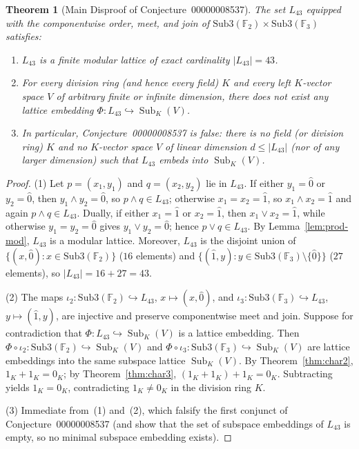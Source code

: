\documentclass[11pt]{article}
\newtheorem{theorem}{Theorem}[section]
\theoremstyle{definition}
\newcommand{\Sub}{\operatorname{Sub}}
\newcommand{\FF}{\mathbb{F}}
\begin{document}
\begin{theorem}[Main Disproof of Conjecture~00000008537]\label{thm:main}
The set $L_{43}$ equipped with the componentwise order, meet, and join of
$\mathrm{Sub3}(\FF_2) \times \mathrm{Sub3}(\FF_3)$ satisfies:
\begin{enumerate}
  \item[\textup{(1)}] $L_{43}$ is a finite modular lattice of exact cardinality
  $|L_{43}| = 43$.
  \item[\textup{(2)}] For every division ring (and hence every field) $K$ and every left
  $K$-vector space $V$ of arbitrary finite or infinite dimension, there does \emph{not}
  exist any lattice embedding $\Phi : L_{43} \hookrightarrow \Sub_K(V)$.
  \item[\textup{(3)}] In particular, Conjecture~00000008537 is false: there is no field
  (or division ring) $K$ and no $K$-vector space $V$ of linear dimension $d \le |L_{43}|$
  (nor of any larger dimension) such that $L_{43}$ embeds into $\Sub_K(V)$.
\end{enumerate}
\end{theorem}
\begin{proof}
(1) Let $p = (x_1, y_1)$ and $q = (x_2, y_2)$ lie in $L_{43}$. If either $y_1 = \hat{0}$
or $y_2 = \hat{0}$, then $y_1 \wedge y_2 = \hat{0}$, so $p \wedge q \in L_{43}$; otherwise
$x_1 = x_2 = \hat{1}$, so $x_1 \wedge x_2 = \hat{1}$ and again $p \wedge q \in L_{43}$.
Dually, if either $x_1 = \hat{1}$ or $x_2 = \hat{1}$, then $x_1 \vee x_2 = \hat{1}$, while
otherwise $y_1 = y_2 = \hat{0}$ gives $y_1 \vee y_2 = \hat{0}$; hence $p \vee q \in L_{43}$.
By Lemma~\ref{lem:prod-mod}, $L_{43}$ is a modular lattice. Moreover, $L_{43}$ is the
disjoint union of $\{(x, \hat{0}) : x \in \mathrm{Sub3}(\FF_2)\}$ ($16$ elements) and
$\{(\hat{1}, y) : y \in \mathrm{Sub3}(\FF_3) \setminus \{\hat{0}\}\}$ ($27$ elements), so
$|L_{43}| = 16 + 27 = 43$.

(2) The maps $\iota_2 : \mathrm{Sub3}(\FF_2) \hookrightarrow L_{43}$, $x \mapsto
(x, \hat{0})$, and $\iota_3 : \mathrm{Sub3}(\FF_3) \hookrightarrow L_{43}$,
$y \mapsto (\hat{1}, y)$, are injective and preserve componentwise meet and join. Suppose
for contradiction that $\Phi : L_{43} \hookrightarrow \Sub_K(V)$ is a lattice embedding.
Then $\Phi \circ \iota_2 : \mathrm{Sub3}(\FF_2) \hookrightarrow \Sub_K(V)$ and
$\Phi \circ \iota_3 : \mathrm{Sub3}(\FF_3) \hookrightarrow \Sub_K(V)$ are lattice
embeddings into the same subspace lattice $\Sub_K(V)$. By Theorem~\ref{thm:char2},
$1_K + 1_K = 0_K$; by Theorem~\ref{thm:char3}, $(1_K + 1_K) + 1_K = 0_K$. Subtracting
yields $1_K = 0_K$, contradicting $1_K \ne 0_K$ in the division ring $K$.

(3) Immediate from~(1) and~(2), which falsify the first conjunct of
Conjecture~00000008537 (and show that the set of subspace embeddings of $L_{43}$ is empty,
so no minimal subspace embedding exists).
\end{proof}
\end{document}
